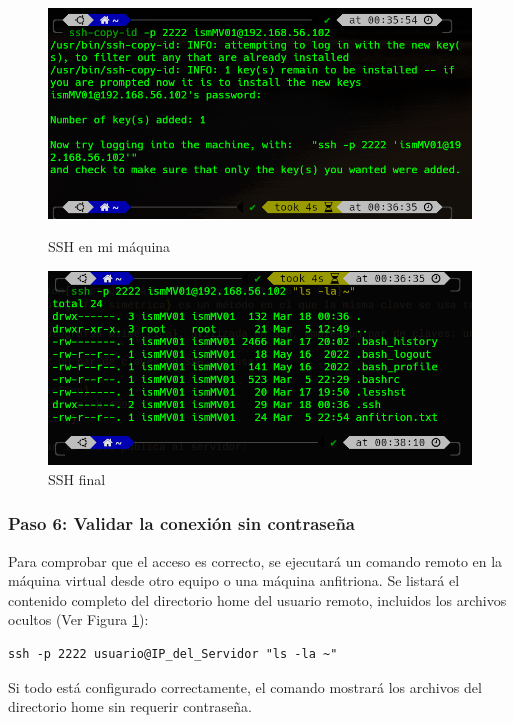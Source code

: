 \begin{figure}[H]
  \centering
  \begin{minipage}[b]{0.45\textwidth}
    \centering
    \includegraphics[width=\textwidth]{images/copiaLlave.png}
    \caption{SSH en mi máquina}
    \label{copiaLlave}
  \end{minipage}
  \hfill
  \begin{minipage}[b]{0.45\textwidth}
    \centering
    \includegraphics[width=\textwidth]{images/finalSSH.png}
    \caption{SSH final}
    \label{finalSSH}
  \end{minipage}
\end{figure}

\subsubsection*{Paso 6: Validar la conexión sin contraseña}

Para comprobar que el acceso es correcto, se ejecutará un comando remoto en la máquina virtual desde otro equipo o una máquina anfitriona. Se listará el contenido completo del directorio home del usuario remoto, incluidos los archivos ocultos (Ver Figura \ref{finalSSH}):

\begin{lstlisting}[style=mystyle]
ssh -p 2222 usuario@IP_del_Servidor "ls -la ~"
\end{lstlisting}

Si todo está configurado correctamente, el comando mostrará los archivos del directorio home sin requerir contraseña.





